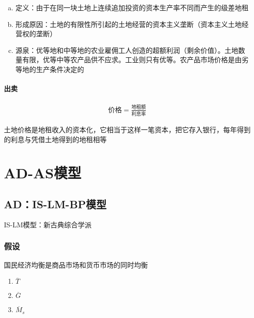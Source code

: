 \documentclass[12pt]{book}
\begin{document}
\begin{enumerate}[1.]
\begin{enumerate}[(1)]
\begin{enumerate}[a.]
                        \item 定义：由于在同一块土地上连续追加投资的资本生产率不同而产生的级差地租
                        \item 形成原因：土地的有限性所引起的土地经营的资本主义垄断（资本主义土地经营权的垄断）
                        \item 源泉：优等地和中等地的农业雇佣工人创造的超额利润（剩余价值）。土地数量有限，优等中等农产品供不应求。工业则只有优等。农产品市场价格是由劣等地的生产条件决定的
                    \end{enumerate}
          \end{enumerate}
\end{enumerate}











\subsubsection{出卖}

\begin{gather*}
    \text{价格}=\frac{\text{地租额}}{\text{利息率}}
\end{gather*}


土地价格是地租收入的资本化，它相当于这样一笔资本，把它存入银行，每年得到的利息与凭借土地得到的地租相等



\chapter{AD-AS模型}\label{chapter:AD-AS模型}


\section{AD：IS-LM-BP模型}

IS-LM模型：新古典综合学派



\subsection{假设}
国民经济均衡是商品市场和货币市场的同时均衡

\begin{enumerate}[1.]
    \item $\overline{T}$
    \item $\overline{G}$
    \item $\overline{M}_s$ 
\end{enumerate}
\end{document}
